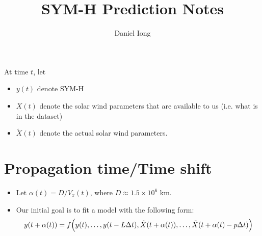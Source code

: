 \documentclass{article}
\title{SYM-H Prediction Notes}
\author{Daniel Iong}
\date{}
\begin{document}
\maketitle


At time $t$, let 
\begin{itemize}
    \item $y(t)$ denote SYM-H
    \item $X(t)$ denote the solar wind parameters that are available to us (i.e. what is in the dataset)
    \item $\tilde{X}(t)$ denote the actual solar wind parameters.
\end{itemize}

\section{Propagation time/Time shift}

\begin{itemize}
    \item Let $\alpha(t) = D / V_x(t)$, where $D \approx 1.5 \times 10^6$ km.
    \item Our initial goal is to fit a model with the following form:
    \begin{align*}
        y(t + \alpha(t)) = f \Bigl(y(t),\dots,y(t- L\Delta t), \tilde{X}(t + \alpha(t)),\dots, \tilde{X}(t + \alpha(t) - p \Delta t) \Bigr)
    \end{align*}
\end{itemize}
\end{document}
